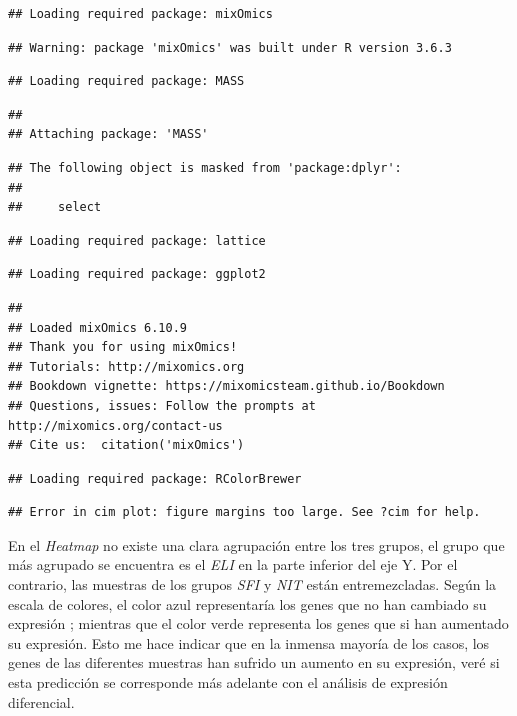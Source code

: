 \documentclass[]{article}
\begin{document}
\begin{verbatim}
## Loading required package: mixOmics
\end{verbatim}

\begin{verbatim}
## Warning: package 'mixOmics' was built under R version 3.6.3
\end{verbatim}

\begin{verbatim}
## Loading required package: MASS
\end{verbatim}

\begin{verbatim}
## 
## Attaching package: 'MASS'
\end{verbatim}

\begin{verbatim}
## The following object is masked from 'package:dplyr':
## 
##     select
\end{verbatim}

\begin{verbatim}
## Loading required package: lattice
\end{verbatim}

\begin{verbatim}
## Loading required package: ggplot2
\end{verbatim}

\begin{verbatim}
## 
## Loaded mixOmics 6.10.9
## Thank you for using mixOmics!
## Tutorials: http://mixomics.org
## Bookdown vignette: https://mixomicsteam.github.io/Bookdown
## Questions, issues: Follow the prompts at http://mixomics.org/contact-us
## Cite us:  citation('mixOmics')
\end{verbatim}

\begin{verbatim}
## Loading required package: RColorBrewer
\end{verbatim}

\begin{verbatim}
## Error in cim plot: figure margins too large. See ?cim for help.
\end{verbatim}

En el \emph{Heatmap} no existe una clara agrupación entre los tres
grupos, el grupo que más agrupado se encuentra es el \emph{ELI} en la
parte inferior del eje Y. Por el contrario, las muestras de los grupos
\emph{SFI} y \emph{NIT} están entremezcladas. Según la escala de
colores, el color azul representaría los genes que no han cambiado su
expresión ; mientras que el color verde representa los genes que si han
aumentado su expresión. Esto me hace indicar que en la inmensa mayoría
de los casos, los genes de las diferentes muestras han sufrido un
aumento en su expresión, veré si esta predicción se corresponde más
adelante con el análisis de expresión diferencial.
\end{document}
